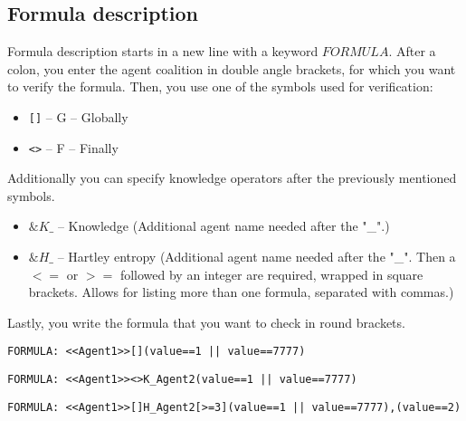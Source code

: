 \documentclass[12pt]{article}
\begin{document}
\subsection{Formula description}
Formula description starts in a new line with a keyword $FORMULA$. After a colon, you enter the agent coalition in double angle brackets, for which you want to verify the formula. Then, you use one of the symbols used for verification:
\begin{itemize}
  \item \verb+[]+ -- G -- Globally
  \item \verb+<>+ -- F -- Finally
\end{itemize}
Additionally you can specify knowledge operators after the previously mentioned symbols.
\begin{itemize}
  \item $\&K{\_}$ -- Knowledge (Additional agent name needed after the "{\_}".)
  \item $\&H{\_}$ -- Hartley entropy (Additional agent name needed after the "{\_}". Then a $<=$ or $>=$ followed by an integer are required, wrapped in square brackets. Allows for listing more than one formula, separated with commas.)
\end{itemize}
Lastly, you write the formula that you want to check in round brackets.
\begin{lstlisting}[title={A formula that checks if there is a strategy that globally Agent1 could take such actions that the value will be always equal to 1 or 7777.}]
  FORMULA: <<Agent1>>[](value==1 || value==7777)
\end{lstlisting}
\begin{lstlisting}[title={A formula that uses a knowledge operator.}]
  FORMULA: <<Agent1>><>K_Agent2(value==1 || value==7777)
\end{lstlisting}
\begin{lstlisting}[title={A formula that uses a Hartley operator.}]
  FORMULA: <<Agent1>>[]H_Agent2[>=3](value==1 || value==7777),(value==2)
\end{lstlisting}
\end{document}
